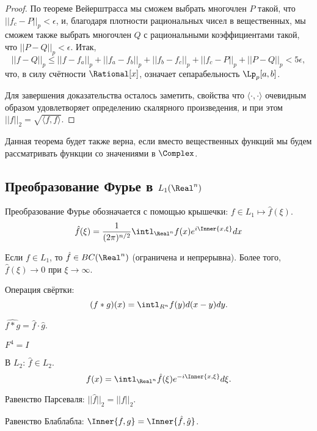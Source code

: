 \documentclass[main]{subfiles}
\begin{document}
\begin{proof}
  По теореме Вейерштрасса мы сможем
  выбрать многочлен \( P \) такой,
  что \( ||f_c - P||_p < \epsilon \),
  и, благодаря плотности рациональных чисел
  в вещественных, мы сможем также выбрать
  многочлен \( Q \) с рациональными коэффициентами
  такой, что \( ||P - Q||_p < \epsilon \).
  Итак,
  \[
    ||f - Q||_p \le ||f - f_a||_p + ||f_a - f_b||_p
    + ||f_b - f_c||_p + ||f_c - P||_p + ||P - Q||_p <
    5 \epsilon,
  \]
  что, в силу счётности \( \Rational[x] \),
  означает сепарабельность \( \Lp_p[a, b] \).

  Для завершения доказательства осталось заметить,
  свойства
  что \( \langle \cdot, \cdot \rangle \) очевидным
  образом удовлетворяет определению скалярного
  произведения, и при этом
  \( ||f||_2 = \sqrt{\langle f, f \rangle} \).
\end{proof}

\begin{remark}
  Данная теорема будет также верна,
  если вместо вещественных функций
  мы будем рассматривать функции
  со значениями в \( \Complex \).
\end{remark}

\subsection{Преобразование Фурье в \( L_1(\Real^n) \)}

Преобразование Фурье обозначается с помощью крышечки:
\( f \in L_1 \mapsto \hat f (\xi) \).
\[
  \hat f (\xi) = \frac1{(2 \pi)^{n/2}} \intl_{\Real^n} f(x) e^{i\Inner{x, \xi}} dx
\]

\begin{theorem*}
  Если \( f \in L_1 \), то \( \hat f \in BC(\Real^n) \)
  (ограничена и непрерывна).
  Более того, \( \hat f(\xi) \to 0 \)  при \( \xi \to \infty \).
\end{theorem*}

Операция свёртки:
\[
  (f * g)(x) = \intl_{R^n} f(y) d(x - y) dy.
\]

\begin{theorem*}
  \( \widehat{f * g} = \hat f \cdot \hat g \).
\end{theorem*}

\( F^4 = I \)

В \( L_2 \): \( \hat f \in L_2 \).
\[
  f(x) = \intl_{\Real^n} \hat f(\xi) e^{-i \Inner{x, \xi}} d \xi.
\]

Равенство Парсеваля: \( ||\hat f||_2 = ||f||_2 \).

Равенство Блаблабла: \( \Inner{f, g} = \Inner{\hat f, \hat g} \).
\end{document}

